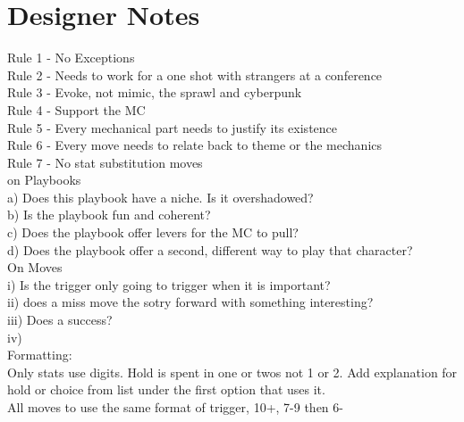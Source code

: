 \documentclass{tufte-book}
\begin{document}
\chapter{Designer Notes}

Rule 1 - No Exceptions\\
Rule 2 - Needs to work for a one shot with strangers at a conference\\
Rule 3 - Evoke, not mimic, the sprawl and cyberpunk\\
Rule 4 - Support the MC\\
Rule 5 - Every mechanical part needs to justify its existence\\
Rule 6 - Every move needs to relate back to theme or the mechanics\\
Rule 7 - No stat substitution moves\\

on Playbooks\\
a) Does this playbook have a niche. Is it overshadowed?\\
b) Is the playbook fun and coherent?\\
c) Does the playbook offer levers for the MC to pull?\\
d) Does the playbook offer a second, different way to play that character?\\

On Moves\\
i) Is the trigger only going to trigger when it is important?\\
ii) does a miss move the sotry forward with something interesting?\\
iii) Does a success?\\
iv) \\

Formatting:\\
Only stats use digits. Hold is spent in one or twos not 1 or 2. Add explanation for hold or choice from list under the first option that uses it.\\
All moves to use the same format of trigger, 10+, 7-9 then 6-\\









\backmatter




\printindex[stuff]

\printindex
\end{document}
